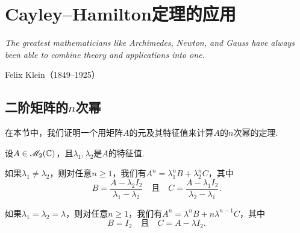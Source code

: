 \chapter{Cayley--Hamilton定理的应用}
\begin{proverb}
  { \itshape
   The greatest mathematicians like Archimedes,
   Newton, and Gauss have always been able
   to combine theory and applications into one.
  }

\hfill Felix Klein（1849–1925）
\end{proverb}

\section{二阶矩阵的$n$次幂}

在本节中，我们证明一个用矩阵$A$的元及其特征值来计算$A$的$n$次幂的定理.

\begin{mybox}
  \begin{theorem}
    设$A\in\mathscr M_2(\mathbb C)$，且$\lambda_1,\lambda_2$是$A$的特征值.
    \begin{enum}
      \item 如果$\lambda_1\ne\lambda_2$，则对任意$n\ge1$，我们有$A^n=\lambda_1^nB+\lambda_2^nC$，其中
          \[
            B = \frac{A-\lambda_2I_2}{\lambda_1-\lambda_2}
            \quad \text{且}\quad C = \frac{A-\lambda_1I_2}{\lambda_2-\lambda_1}.
          \]
      \item 如果$\lambda_1=\lambda_2=\lambda$，则对任意$n\ge1$，我们有$A^n=\lambda^nB+n\lambda^{n-1}C $，其中
          \[
            B=I_2 \quad \text{且}\quad
            C = A - \lambda I_2.
          \]
    \end{enum}
  \end{theorem}
\end{mybox}

